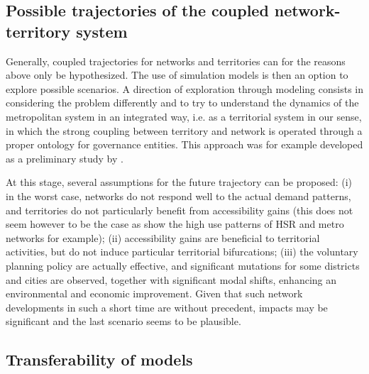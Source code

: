 \documentclass[11pt]{article}
\begin{document}
\subsection{Possible trajectories of the coupled network-territory system}


Generally, coupled trajectories for networks and territories can for the reasons above only be hypothesized. The use of simulation models is then an option to explore possible scenarios. A direction of exploration through modeling consists in considering the problem differently and to try to understand the dynamics of the metropolitan system in an integrated way, i.e. as a territorial system in our sense, in which the strong coupling between territory and network is operated through a proper ontology for governance entities. This approach was for example developed as a preliminary study by \cite{le2015modeling}.

At this stage, several assumptions for the future trajectory can be proposed: (i) in the worst case, networks do not respond well to the actual demand patterns, and territories do not particularly benefit from accessibility gains (this does not seem however to be the case as show the high use patterns of HSR and metro networks for example); (ii) accessibility gains are beneficial to territorial activities, but do not induce particular territorial bifurcations; (iii) the voluntary planning policy are actually effective, and significant mutations for some districts and cities are observed, together with significant modal shifts, enhancing an environmental and economic improvement. Given that such network developments in such a short time are without precedent, impacts may be significant and the last scenario seems to be plausible.


\subsection{Transferability of models}
\end{document}
